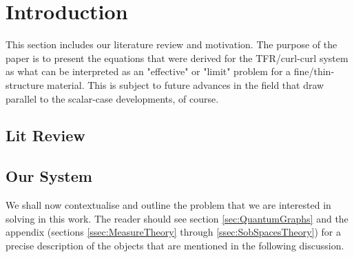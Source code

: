 \section{Introduction} \label{sec:Intro}

This section includes our literature review and motivation.
The purpose of the paper is to present the equations that were derived for the TFR/curl-curl system as what can be interpreted as an "effective" or "limit" problem for a fine/thin-structure material.
This is subject to future advances in the field that draw parallel to the scalar-case developments, of course.

\subsection{Lit Review} \label{ssec:LitReview}

\subsection{Our System} \label{ssec:OurSystem}

We shall now contextualise and outline the problem that we are interested in solving in this work.
The reader should see section \ref{sec:QuantumGraphs} and the appendix (sections \ref{ssec:MeasureTheory} through \ref{ssec:SobSpacesTheory}) for a precise description of the objects that are mentioned in the following discussion. \newline

